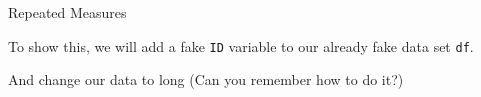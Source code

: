 \begin{frame}[fragile]{Repeated Measures}

\center
To show this, we will add a fake \texttt{ID} variable to our already
fake data set \texttt{df}.

\begin{Shaded}
\begin{Highlighting}[]
\OperatorTok{$}\StringTok{ }\OperatorTok{:}
\end{Highlighting}
\end{Shaded}

And change our data to long (Can you remember how to do it?)

\begin{Shaded}
\begin{Highlighting}[]
\StringTok{ }\NormalTok{, }\NormalTok{, }\OperatorTok{:}\NormalTok{)}
\end{Highlighting}
\end{Shaded}


\end{frame}
